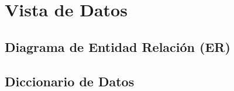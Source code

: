 \section{Vista de Datos} \label{vistaDatos}
    \subsection{Diagrama de Entidad Relación (ER)}
    \subsection{Diccionario de Datos}
